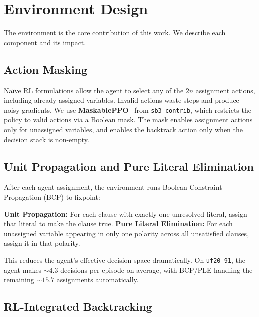 \documentclass{article}
\begin{document}
\section{Environment Design}

The environment is the core contribution of this work. We describe each component and its impact.

\subsection{Action Masking}
\label{sec:masking}

Na\"ive RL formulations allow the agent to select any of the $2n$ assignment actions, including already-assigned variables. Invalid actions waste steps and produce noisy gradients. We use \textbf{MaskablePPO}~\cite{huang2022closer} from \texttt{sb3-contrib}, which restricts the policy to valid actions via a Boolean mask. The mask enables assignment actions only for unassigned variables, and enables the backtrack action only when the decision stack is non-empty.

\subsection{Unit Propagation and Pure Literal Elimination}

After each agent assignment, the environment runs Boolean Constraint Propagation (BCP) to fixpoint:

\begin{algorithm}[h]
\caption{BCP with Pure Literal Elimination}
\label{alg:bcp}
\begin{algorithmic}[1]
\REPEAT
    \STATE \textbf{Unit Propagation:} For each clause with exactly one unresolved literal, assign that literal to make the clause true.
        \STATE \textbf{Pure Literal Elimination:} For each unassigned variable appearing in only one polarity across all unsatisfied clauses, assign it in that polarity.
    \ENDIF
{}
\end{algorithmic}
\end{algorithm}

This reduces the agent's effective decision space dramatically. On \texttt{uf20-91}, the agent makes ${\sim}4.3$ decisions per episode on average, with BCP/PLE handling the remaining ${\sim}15.7$ assignments automatically.

\subsection{RL-Integrated Backtracking}
\end{document}
